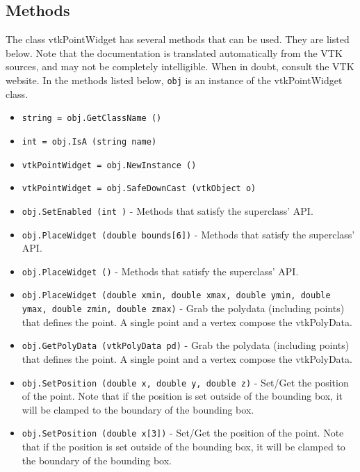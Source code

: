 \subsection{Methods}

The class vtkPointWidget has several methods that can be used.
  They are listed below.
Note that the documentation is translated automatically from the VTK sources,
and may not be completely intelligible.  When in doubt, consult the VTK website.
In the methods listed below, \verb|obj| is an instance of the vtkPointWidget class.
\begin{itemize}
\item  \verb|string = obj.GetClassName ()|

\item  \verb|int = obj.IsA (string name)|

\item  \verb|vtkPointWidget = obj.NewInstance ()|

\item  \verb|vtkPointWidget = obj.SafeDownCast (vtkObject o)|

\item  \verb|obj.SetEnabled (int )| -  Methods that satisfy the superclass' API.

\item  \verb|obj.PlaceWidget (double bounds[6])| -  Methods that satisfy the superclass' API.

\item  \verb|obj.PlaceWidget ()| -  Methods that satisfy the superclass' API.

\item  \verb|obj.PlaceWidget (double xmin, double xmax, double ymin, double ymax, double zmin, double zmax)| -  Grab the polydata (including points) that defines the point. A
 single point and a vertex compose the vtkPolyData.

\item  \verb|obj.GetPolyData (vtkPolyData pd)| -  Grab the polydata (including points) that defines the point. A
 single point and a vertex compose the vtkPolyData.

\item  \verb|obj.SetPosition (double x, double y, double z)| -  Set/Get the position of the point. Note that if the position is set
 outside of the bounding box, it will be clamped to the boundary of
 the bounding box.

\item  \verb|obj.SetPosition (double x[3])| -  Set/Get the position of the point. Note that if the position is set
 outside of the bounding box, it will be clamped to the boundary of
 the bounding box.


\end{itemize}
